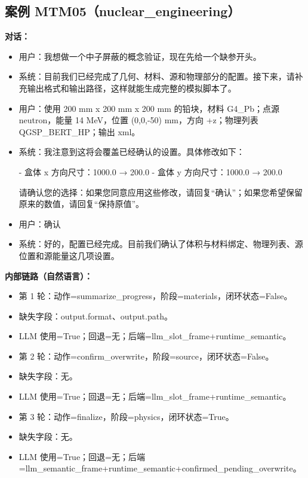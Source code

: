 \documentclass[11pt]{ctexart}
\begin{document}
\subsection{案例 MTM05（nuclear\_engineering）}
\textbf{对话：}
\begin{itemize}
\item 用户：我想做一个中子屏蔽的概念验证，现在先给一个缺参开头。
\item 系统：目前我们已经完成了几何、材料、源和物理部分的配置。接下来，请补充输出格式和输出路径，这样就能生成完整的模拟脚本了。
\item 用户：使用 200 mm x 200 mm x 200 mm 的铅块，材料 G4\_Pb；点源 neutron，能量 14 MeV，位置 (0,0,-50) mm，方向 +z；物理列表 QGSP\_BERT\_HP；输出 xml。
\item 系统：我注意到这将会覆盖已经确认的设置。具体修改如下：

- 盒体 x 方向尺寸：1000.0 → 200.0
- 盒体 y 方向尺寸：1000.0 → 200.0

请确认您的选择：如果您同意应用这些修改，请回复“确认”；如果您希望保留原来的数值，请回复“保持原值”。
\item 用户：确认
\item 系统：好的，配置已经完成。目前我们确认了体积与材料绑定、物理列表、源位置和源能量这几项设置。
\end{itemize}
\textbf{内部链路（自然语言）：}
\begin{itemize}
\item 第 1 轮：动作=summarize\_progress，阶段=materials，闭环状态=False。
\item 缺失字段：output.format、output.path。
\item LLM 使用=True；回退=无；后端=llm\_slot\_frame+runtime\_semantic。
\item 第 2 轮：动作=confirm\_overwrite，阶段=source，闭环状态=False。
\item 缺失字段：无。
\item LLM 使用=True；回退=无；后端=llm\_slot\_frame+runtime\_semantic。
\item 第 3 轮：动作=finalize，阶段=physics，闭环状态=True。
\item 缺失字段：无。
\item LLM 使用=True；回退=无；后端=llm\_semantic\_frame+runtime\_semantic+confirmed\_pending\_overwrite。
\end{itemize}
\end{document}
